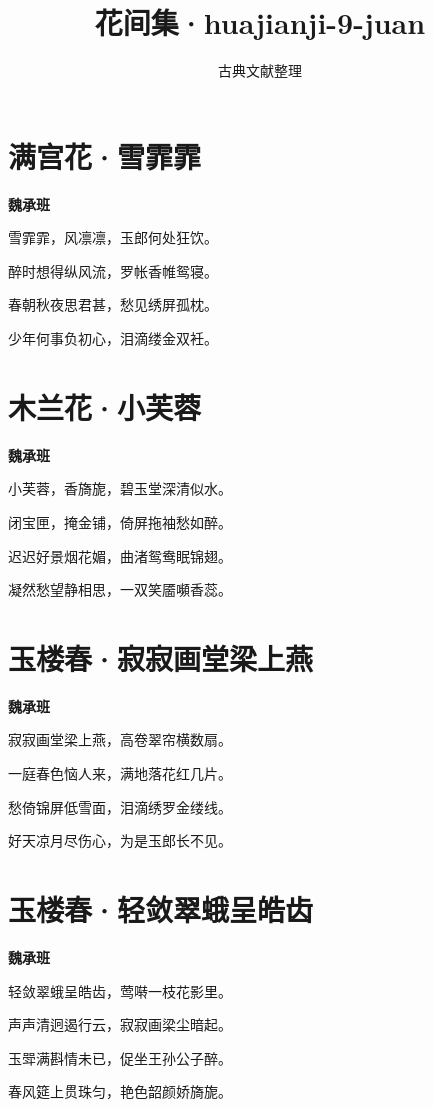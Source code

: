 \documentclass[12pt,a4paper]{ctexbook}
\title{花间集·huajianji-9-juan}
\author{古典文献整理}
\date{}
\begin{document}
\maketitle
\tableofcontents
\newpage
\section{满宫花·雪霏霏}
\textbf{魏承班}\par\vspace{0.5em}
雪霏霏，风凛凛，玉郎何处狂饮。\par
醉时想得纵风流，罗帐香帷鸳寝。\par
春朝秋夜思君甚，愁见绣屏孤枕。\par
少年何事负初心，泪滴缕金双衽。\par

\section{木兰花·小芙蓉}
\textbf{魏承班}\par\vspace{0.5em}
小芙蓉，香旖旎，碧玉堂深清似水。\par
闭宝匣，掩金铺，倚屏拖袖愁如醉。\par
迟迟好景烟花媚，曲渚鸳鸯眠锦翅。\par
凝然愁望静相思，一双笑靥嚬香蕊。\par

\section{玉楼春·寂寂画堂梁上燕}
\textbf{魏承班}\par\vspace{0.5em}
寂寂画堂梁上燕，高卷翠帘横数扇。\par
一庭春色恼人来，满地落花红几片。\par
愁倚锦屏低雪面，泪滴绣罗金缕线。\par
好天凉月尽伤心，为是玉郎长不见。\par

\section{玉楼春·轻敛翠蛾呈皓齿}
\textbf{魏承班}\par\vspace{0.5em}
轻敛翠蛾呈皓齿，莺啭一枝花影里。\par
声声清迥遏行云，寂寂画梁尘暗起。\par
玉斝满斟情未已，促坐王孙公子醉。\par
春风筵上贯珠匀，艳色韶颜娇旖旎。\par
\end{document}
